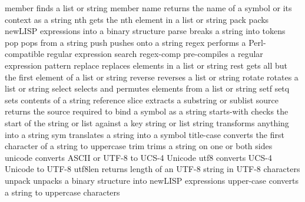 \documentclass[cn,11pt]{elegantbook}
\begin{document}
member            finds a list or string member
name              returns the name of a symbol or its context as a string
nth               gets the nth element in a list or string
pack              packs newLISP expressions into a binary structure
parse             breaks a string into tokens
pop               pops from a string
push              pushes onto a string
regex             performs a Perl-compatible regular expression search
regex-comp        pre-compiles a regular expression pattern
replace           replaces elements in a list or string
rest              gets all but the first element of a list or string
reverse           reverses a list or string
rotate            rotates a list or string
select            selects and permutes elements from a list or string
setf setq         sets contents of a string reference
slice             extracts a substring or sublist
source            returns the source required to bind a symbol as a string
starts-with       checks the start of the string or list against a key string or list
string            transforms anything into a string
sym               translates a string into a symbol
title-case        converts the first character of a string to uppercase
trim              trims a string on one or both sides
unicode           converts ASCII or UTF-8 to UCS-4 Unicode
utf8              converts UCS-4 Unicode to UTF-8
utf8len           returns length of an UTF-8 string in UTF-8 characters
unpack            unpacks a binary structure into newLISP expressions
upper-case        converts a string to uppercase characters
\end{document}
